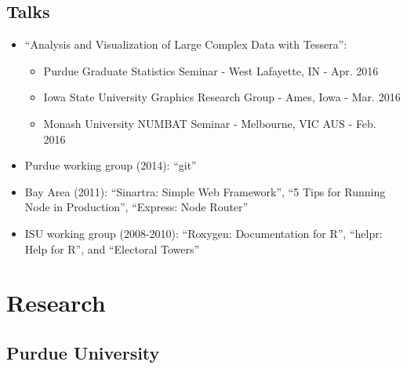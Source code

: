 \documentclass[oneside]{article}
\begin{document}
  \subsection{Talks}
    \begin{itemize}
    	\item ``Analysis and Visualization of Large Complex Data with Tessera'':
		\begin{itemize}
			\item Purdue Graduate Statistics Seminar - West Lafayette, IN - Apr. 2016
			\item Iowa State University Graphics Research Group - Ames, Iowa - Mar. 2016
			\item Monash University NUMBAT Seminar - Melbourne, VIC AUS - Feb. 2016
		\end{itemize}


      \item Purdue working group (2014): ``git''
      \item Bay Area (2011): ``Sinartra: Simple Web Framework'', ``5 Tips for Running Node in Production'',
  ``Express: Node Router''
      \item ISU working group (2008-2010): ``Roxygen: Documentation for R'', ``helpr: Help for R'', and ``Electoral Towers''
    \end{itemize}


\section{Research}

\subsection{Purdue University}
\end{document}
